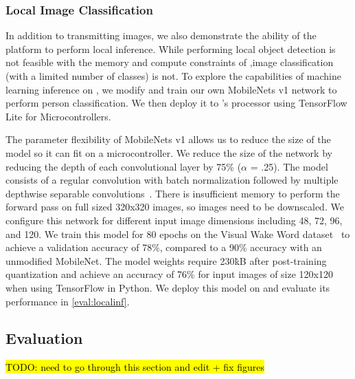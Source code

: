 \subsubsection{Local Image Classification}
In addition to transmitting images, we also demonstrate the ability of the platform to perform local inference.
While performing local object detection is not feasible with the memory and compute constraints of \namec,image classification (with a limited number of classes) is not. 
To explore the capabilities of machine learning inference on \namec,
we modify and train our own MobileNets v1 network to perform person classification. We then deploy it to \namec's processor using TensorFlow Lite for Microcontrollers. 

The parameter flexibility of MobileNets v1 allows us to reduce the size of the model so it can fit on a microcontroller. We reduce the size of the network by reducing the depth of each convolutional layer by 75\% ($\alpha$ = .25).  
The model consists of a regular convolution with batch normalization followed by multiple depthwise separable convolutions~\cite{howard2017mobilenets}. 
There is insufficient memory to perform the forward pass on full sized 320x320 images, so images need to be downscaled. We configure this network for different input image dimensions including 48, 72, 96, and 120.
We train this model for 80 epochs on the Visual Wake Word dataset~\cite{chowdhery2019visual} to achieve a validation accuracy of 78\%, compared to a 90\% accuracy with an unmodified MobileNet. The model weights require 230\.kB after post-training quantization and achieve an accuracy of 76\% for input images of size 120x120 when using TensorFlow in Python. We deploy this model on \namec and evaluate its performance in \cref{eval:localinf}.

\subsection{\namec Evaluation}
\hl{TODO: need to go through this section and edit + fix figures}



